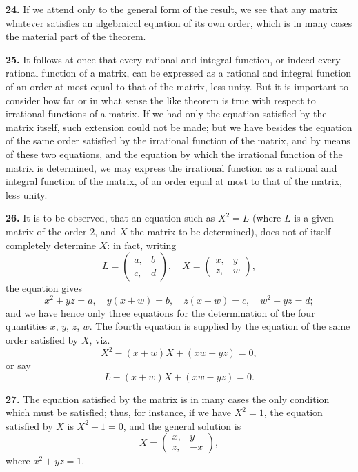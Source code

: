 \documentclass[12pt,a4paper]{article}
\theoremstyle{definition}
\begin{document}
\medskip
\noindent\textbf{24.} If we attend only to the general form of the result, we see that any matrix whatever satisfies an algebraical equation of its own order, which is in many cases the material part of the theorem.

\medskip
\noindent\textbf{25.} It follows at once that every rational and integral function, or indeed every rational function of a matrix, can be expressed as a rational and integral function of an order at most equal to that of the matrix, less unity. But it is important to consider how far or in what sense the like theorem is true with respect to irrational functions of a matrix. If we had only the equation satisfied by the matrix itself, such extension could not be made; but we have besides the equation of the same order satisfied by the irrational function of the matrix, and by means of these two equations, and the equation by which the irrational function of the matrix is determined, we may express the irrational function as a rational and integral function of the matrix, of an order equal at most to that of the matrix, less unity.

\medskip
\noindent\textbf{26.} It is to be observed, that an equation such as $X^2 = L$ (where $L$ is a given matrix of the order 2, and $X$ the matrix to be determined), does not of itself completely determine $X$: in fact, writing
\[
L = \begin{pmatrix} a, & b \\ c, & d \end{pmatrix},\quad
X = \begin{pmatrix} x, & y \\ z, & w \end{pmatrix},
\]
the equation gives
\[x^2+yz = a,\quad y(x+w)=b,\quad z(x+w)=c,\quad w^2+yz=d;\]
and we have hence only three equations for the determination of the four quantities $x$, $y$, $z$, $w$. The fourth equation is supplied by the equation of the same order satisfied by $X$, viz.
\[
X^2 - (x+w)X + (xw-yz) = 0,
\]
or say
\[
L - (x+w)X + (xw-yz) = 0.
\]

\newpage

\medskip
\noindent\textbf{27.} The equation satisfied by the matrix is in many cases the only condition which must be satisfied; thus, for instance, if we have $X^2 = 1$, the equation satisfied by $X$ is $X^2 - 1 = 0$, and the general solution is
\[
X = \begin{pmatrix} x, & y \\ z, & -x \end{pmatrix},
\]
where $x^2 + yz = 1$.
\end{document}
